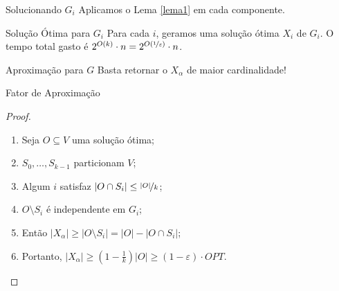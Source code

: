 \begin{frame}{Solucionando $G_i$}
    \centering\Large
    Aplicamos o Lema \ref{lema1} em cada componente.
\end{frame}

\begin{frame}{Solução Ótima para $G_i$}
    \centering\Large
    Para cada $i$, geramos uma solução ótima $X_i$ de $G_i$.
    \bigbreak
    O tempo total gasto é $2^{O(k)} \cdot n = 2^{O(\nicefrac{1}{\varepsilon})} \cdot n$.
\end{frame}

\begin{frame}{Aproximação para $G$}
    \centering\Large
    Basta retornar o $X_\alpha$ de maior cardinalidade!
\end{frame}

\begin{frame}{Fator de Aproximação}
    \pause
    \begin{proof}
        \begin{enumerate}
            \setlength\itemsep{1em}
            \item<2,8> Seja $O \subseteq V$ uma solução ótima;
            \item<3,8> $S_0, \dots, S_{k-1}$ particionam $V$;
            \item<4,8> Algum $i$ satisfaz $|O \cap S_i| \leq \nicefrac{|O|}{k}$;
            \item<5,8> $O \setminus S_i$ é independente em $G_i$;
            \item<6,8> Então $|X_\alpha| \ge |O \setminus S_i| = |O| - |O \cap S_i|$;
            \item<7,8> Portanto, $|X_\alpha| \ge \left(1 - \frac{1}{k}\right)|O| \ge (1 - \varepsilon) \cdot OPT$.
        \end{enumerate}
    \end{proof}
\end{frame}
